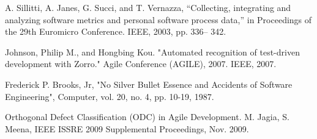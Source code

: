 \documentclass{article}
\begin{document}
\begin{thebibliography}{1}
 A. Sillitti, A. Janes, G. Succi, and T. Vernazza, “Collecting, integrating and analyzing software metrics and personal software process data,” in Proceedings of the 29th Euromicro Conference. IEEE, 2003, pp. 336– 342.

 Johnson, Philip M., and Hongbing Kou. "Automated recognition of test-driven development with Zorro." Agile Conference (AGILE), 2007. IEEE, 2007.

 Frederick P. Brooks, Jr, "No Silver Bullet Essence and Accidents of Software Engineering", Computer, vol. 20, no. 4, pp. 10-19, 1987.

 Orthogonal Defect Classification (ODC) in Agile Development. M. Jagia, S. Meena, IEEE ISSRE 2009 Supplemental Proceedings, Nov. 2009.




\end{thebibliography}
\end{document}
